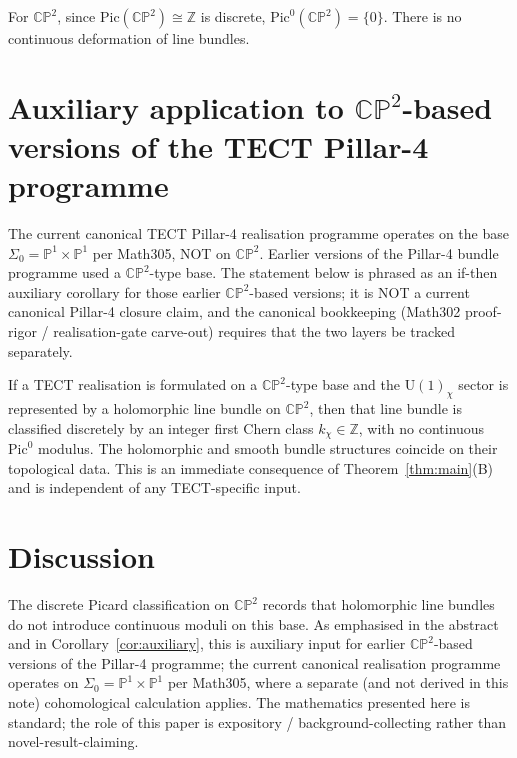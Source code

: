 For $\mathbb{CP}^2$, since $\mathrm{Pic}(\mathbb{CP}^2) \cong \mathbb{Z}$ is
discrete, $\mathrm{Pic}^0(\mathbb{CP}^2) = \{0\}$. There is no continuous
deformation of line bundles.

\section{Auxiliary application to $\mathbb{CP}^2$-based versions of
the TECT Pillar-4 programme}
The current canonical TECT Pillar-4 realisation programme operates on
the base $\Sigma_0 = \mathbb{P}^1 \times \mathbb{P}^1$ per Math305,
NOT on $\mathbb{CP}^2$. Earlier versions of the Pillar-4 bundle
programme used a $\mathbb{CP}^2$-type base. The statement below is
phrased as an if-then auxiliary corollary for those earlier
$\mathbb{CP}^2$-based versions; it is NOT a current canonical
Pillar-4 closure claim, and the canonical bookkeeping (Math302
proof-rigor / realisation-gate carve-out) requires that the two
layers be tracked separately.

\begin{corollary}
\label{cor:auxiliary}
If a TECT realisation is formulated on a $\mathbb{CP}^2$-type base
and the U$(1)_\chi$ sector is represented by a holomorphic line
bundle on $\mathbb{CP}^2$, then that line bundle is classified
discretely by an integer first Chern class $k_\chi \in \mathbb{Z}$,
with no continuous $\mathrm{Pic}^0$ modulus. The holomorphic and
smooth bundle structures coincide on their topological data. This
is an immediate consequence of Theorem~\ref{thm:main}(B) and is
independent of any TECT-specific input.
\end{corollary}

\section{Discussion}
The discrete Picard classification on $\mathbb{CP}^2$ records that
holomorphic line bundles do not introduce continuous moduli on this
base. As emphasised in the abstract and in
Corollary~\ref{cor:auxiliary}, this is auxiliary input for earlier
$\mathbb{CP}^2$-based versions of the Pillar-4 programme; the
current canonical realisation programme operates on
$\Sigma_0 = \mathbb{P}^1 \times \mathbb{P}^1$ per Math305, where a
separate (and not derived in this note) cohomological calculation
applies. The mathematics presented here is standard;
the role of this paper is expository / background-collecting rather
than novel-result-claiming.

